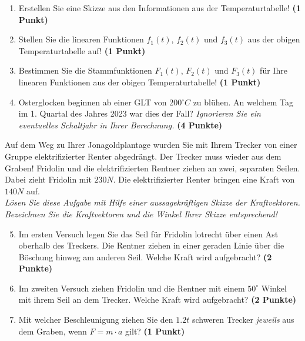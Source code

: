 \documentclass[a4paper, 9pt]{scrartcl}\usepackage[]{graphicx}\usepackage[]{xcolor}
\begin{document}
\begin{enumerate}
\item Erstellen Sie eine Skizze aus den Informationen aus der
  Temperaturtabelle!  \textbf{(1 Punkt)}
\item Stellen Sie die linearen Funktionen $f_1(t)$, $f_2(t)$ und
  $f_3(t)$ aus der obigen Temperaturtabelle auf!  \textbf{(1 Punkt)}
\item Bestimmen Sie die Stammfunktionen $F_1(t)$, $F_2(t)$ und $F_3(t)$ f{\"u}r
  Ihre linearen Funktionen aus der obigen Temperaturtabelle!  \textbf{(1
    Punkt)}
\item Osterglocken beginnen ab einer GLT von 200$^\circ C$ zu bl{\"u}hen. An
  welchem Tag im 1. Quartal des Jahres 2023 war dies der
  Fall? \textit{Ignorieren Sie ein eventuelles Schaltjahr in Ihrer Berechnung.} \textbf{(4 Punkte)}
\end{enumerate}

Auf dem Weg zu Ihrer Jonagoldplantage wurden Sie mit Ihrem Trecker von
einer Gruppe elektrifizierter Renter abgedr{\"a}ngt. Der Trecker muss wieder
aus dem Graben! Fridolin und die elektrifizierten Rentner ziehen an zwei,
separaten Seilen. Dabei zieht Fridolin mit $230N$. Die
elektrifizierter Renter  bringen eine Kraft von $140N$ auf.\\

\textit{L{\"o}sen Sie diese Aufgabe mit Hilfe einer aussagekr{\"a}ftigen Skizze der
  Kraftvektoren. Bezeichnen Sie die Kraftvektoren und die Winkel Ihrer
  Skizze entsprechend!}

\begin{enumerate}
  \setcounter{enumi}{4}  
\item Im ersten Versuch legen Sie das Seil f{\"u}r Fridolin lotrecht {\"u}ber einen
  Ast oberhalb des Treckers. Die Rentner ziehen in einer geraden Linie {\"u}ber
  die B{\"o}schung hinweg am anderen Seil. Welche Kraft wird aufgebracht?
  \textbf{(2 Punkte)}
\item Im zweiten Versuch ziehen Fridolin und die Rentner mit einem
  $50^\circ$ Winkel mit ihrem Seil an dem Trecker. Welche Kraft
  wird aufgebracht? \textbf{(2 Punkte)}
\item Mit welcher Beschleunigung ziehen Sie den $1.2t$ schweren
  Trecker \textit{jeweils} aus dem Graben, wenn $F = m \cdot a$ gilt?
  \textbf{(1 Punkt)}
\end{enumerate}

 
\clearpage
\end{document}
